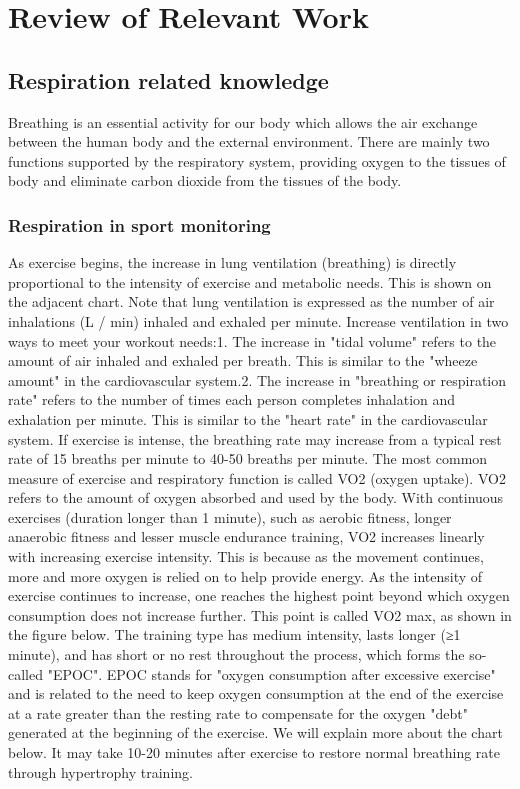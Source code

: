 \chapter{Review of Relevant Work}
\section{Respiration related knowledge}
Breathing is an essential activity for our body which allows the air exchange between the human body and the external environment. There are mainly two functions supported by the respiratory system, providing oxygen to the tissues of body and eliminate carbon dioxide from the tissues of the body. 

\subsection{Respiration in sport monitoring}

As exercise begins, the increase in lung ventilation (breathing) is directly proportional to the intensity of exercise and metabolic needs. This is shown on the adjacent chart. Note that lung ventilation is expressed as the number of air inhalations (L / min) inhaled and exhaled per minute. Increase ventilation in two ways to meet your workout needs:1. The increase in "tidal volume" refers to the amount of air inhaled and exhaled per breath. This is similar to the "wheeze amount" in the cardiovascular system.2. The increase in "breathing or respiration rate" refers to the number of times each person completes inhalation and exhalation per minute. This is similar to the "heart rate" in the cardiovascular system. If exercise is intense, the breathing rate may increase from a typical rest rate of 15 breaths per minute to 40-50 breaths per minute. The most common measure of exercise and respiratory function is called VO2 (oxygen uptake). VO2 refers to the amount of oxygen absorbed and used by the body. With continuous exercises (duration longer than 1 minute), such as aerobic fitness, longer anaerobic fitness and lesser muscle endurance training, VO2 increases linearly with increasing exercise intensity. This is because as the movement continues, more and more oxygen is relied on to help provide energy. As the intensity of exercise continues to increase, one reaches the highest point beyond which oxygen consumption does not increase further. This point is called VO2 max, as shown in the figure below. The training type has medium intensity, lasts longer (≥1 minute), and has short or no rest throughout the process, which forms the so-called "EPOC". EPOC stands for "oxygen consumption after excessive exercise" and is related to the need to keep oxygen consumption at the end of the exercise at a rate greater than the resting rate to compensate for the oxygen "debt" generated at the beginning of the exercise. We will explain more about the chart below. It may take 10-20 minutes after exercise to restore normal breathing rate through hypertrophy training.


